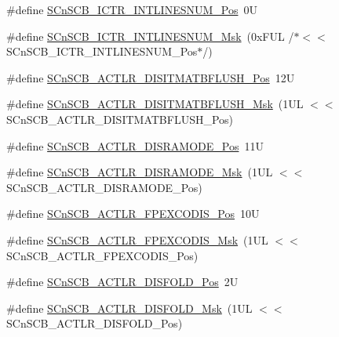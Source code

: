 \begin{DoxyCompactItemize}
\item 
\#define \mbox{\hyperlink{group___c_m_s_i_s___s_cn_s_c_b_ga0777ddf379af50f9ca41d40573bfffc5}{S\+Cn\+S\+C\+B\+\_\+\+I\+C\+T\+R\+\_\+\+I\+N\+T\+L\+I\+N\+E\+S\+N\+U\+M\+\_\+\+Pos}}~0U
\item 
\#define \mbox{\hyperlink{group___c_m_s_i_s___s_cn_s_c_b_ga3efa0f5210051464e1034b19fc7b33c7}{S\+Cn\+S\+C\+B\+\_\+\+I\+C\+T\+R\+\_\+\+I\+N\+T\+L\+I\+N\+E\+S\+N\+U\+M\+\_\+\+Msk}}~(0x\+F\+U\+L /$\ast$$<$$<$ S\+Cn\+S\+C\+B\+\_\+\+I\+C\+T\+R\+\_\+\+I\+N\+T\+L\+I\+N\+E\+S\+N\+U\+M\+\_\+\+Pos$\ast$/)
\item 
\#define \mbox{\hyperlink{group___c_m_s_i_s___s_cn_s_c_b_ga5f888e0ebc18cc2d99976405777c142f}{S\+Cn\+S\+C\+B\+\_\+\+A\+C\+T\+L\+R\+\_\+\+D\+I\+S\+I\+T\+M\+A\+T\+B\+F\+L\+U\+S\+H\+\_\+\+Pos}}~12U
\item 
\#define \mbox{\hyperlink{group___c_m_s_i_s___s_cn_s_c_b_ga46b16a03b408184720134ef42203ac2e}{S\+Cn\+S\+C\+B\+\_\+\+A\+C\+T\+L\+R\+\_\+\+D\+I\+S\+I\+T\+M\+A\+T\+B\+F\+L\+U\+S\+H\+\_\+\+Msk}}~(1\+U\+L $<$$<$ S\+Cn\+S\+C\+B\+\_\+\+A\+C\+T\+L\+R\+\_\+\+D\+I\+S\+I\+T\+M\+A\+T\+B\+F\+L\+U\+S\+H\+\_\+\+Pos)
\item 
\#define \mbox{\hyperlink{group___c_m_s_i_s___s_cn_s_c_b_ga1bffb5e05053d15cbe42fbe87d225dcb}{S\+Cn\+S\+C\+B\+\_\+\+A\+C\+T\+L\+R\+\_\+\+D\+I\+S\+R\+A\+M\+O\+D\+E\+\_\+\+Pos}}~11U
\item 
\#define \mbox{\hyperlink{group___c_m_s_i_s___s_cn_s_c_b_ga436fc1bd011b15c9585bb3ace5332ce3}{S\+Cn\+S\+C\+B\+\_\+\+A\+C\+T\+L\+R\+\_\+\+D\+I\+S\+R\+A\+M\+O\+D\+E\+\_\+\+Msk}}~(1\+U\+L $<$$<$ S\+Cn\+S\+C\+B\+\_\+\+A\+C\+T\+L\+R\+\_\+\+D\+I\+S\+R\+A\+M\+O\+D\+E\+\_\+\+Pos)
\item 
\#define \mbox{\hyperlink{group___c_m_s_i_s___s_cn_s_c_b_gaa743743f5af93d6ece74a426b355ab70}{S\+Cn\+S\+C\+B\+\_\+\+A\+C\+T\+L\+R\+\_\+\+F\+P\+E\+X\+C\+O\+D\+I\+S\+\_\+\+Pos}}~10U
\item 
\#define \mbox{\hyperlink{group___c_m_s_i_s___s_cn_s_c_b_gadd12baaeeea3220b03867e4b8a1432aa}{S\+Cn\+S\+C\+B\+\_\+\+A\+C\+T\+L\+R\+\_\+\+F\+P\+E\+X\+C\+O\+D\+I\+S\+\_\+\+Msk}}~(1\+U\+L $<$$<$ S\+Cn\+S\+C\+B\+\_\+\+A\+C\+T\+L\+R\+\_\+\+F\+P\+E\+X\+C\+O\+D\+I\+S\+\_\+\+Pos)
\item 
\#define \mbox{\hyperlink{group___c_m_s_i_s___s_cn_s_c_b_gaab395870643a0bee78906bb15ca5bd02}{S\+Cn\+S\+C\+B\+\_\+\+A\+C\+T\+L\+R\+\_\+\+D\+I\+S\+F\+O\+L\+D\+\_\+\+Pos}}~2U
\item 
\#define \mbox{\hyperlink{group___c_m_s_i_s___s_cn_s_c_b_gaa9dd2d4a2350499188f438d0aa9fd982}{S\+Cn\+S\+C\+B\+\_\+\+A\+C\+T\+L\+R\+\_\+\+D\+I\+S\+F\+O\+L\+D\+\_\+\+Msk}}~(1\+U\+L $<$$<$ S\+Cn\+S\+C\+B\+\_\+\+A\+C\+T\+L\+R\+\_\+\+D\+I\+S\+F\+O\+L\+D\+\_\+\+Pos)

\end{DoxyCompactItemize}
